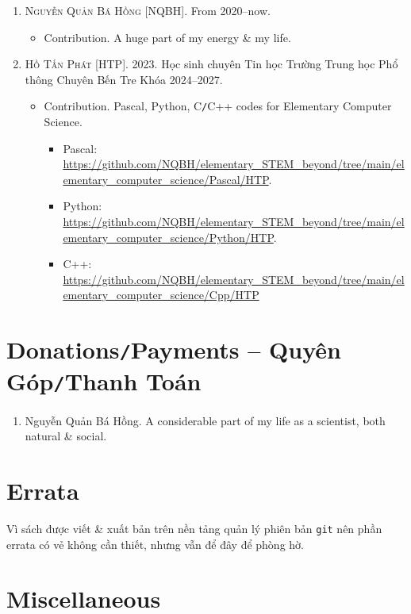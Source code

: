 \documentclass{article}
\begin{document}
\begin{enumerate}
	\item \textsc{Nguyễn Quản Bá Hồng [NQBH].} From 2020--now.
	\begin{itemize}
		\item {\sf Contribution.} A huge part of my energy \& my life.
	\end{itemize}
	\item \textsc{Hồ Tấn Phát [HTP].} 2023. Học sinh chuyên Tin học Trường Trung học Phổ thông Chuyên Bến Tre Khóa 2024--2027.
	\begin{itemize}
		\item {\sf Contribution.} {\sf Pascal, Python, C{\tt/}C++} codes for Elementary Computer Science.
		\begin{itemize}
			\item {\sf Pascal}: \url{https://github.com/NQBH/elementary_STEM_beyond/tree/main/elementary_computer_science/Pascal/HTP}.
			\item {\sf Python}: \url{https://github.com/NQBH/elementary_STEM_beyond/tree/main/elementary_computer_science/Python/HTP}.
			\item {\sf C++}: \url{https://github.com/NQBH/elementary_STEM_beyond/tree/main/elementary_computer_science/Cpp/HTP}
		\end{itemize}		
	\end{itemize}
\end{enumerate}


\section{Donations{\tt/}Payments -- Quyên Góp{\tt/}Thanh Toán}

\begin{enumerate}
	\item {\sc Nguyễn Quản Bá Hồng.} A considerable part of my life as a scientist, both natural \& social.
\end{enumerate}


\section{Errata}
Vì sách được viết \& xuất bản trên nền tảng quản lý phiên bản {\tt git} nên phần errata có vẻ không cần thiết, nhưng vẫn để đây để phòng hờ.


\section{Miscellaneous}


\printbibliography[heading=bibintoc]
	
\end{document}
